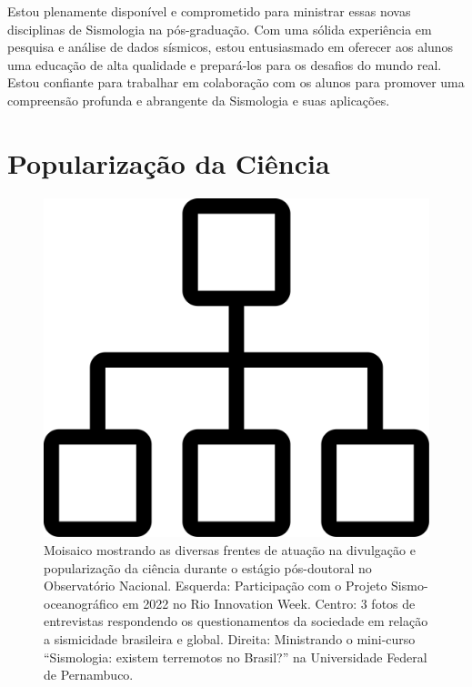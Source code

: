 \documentclass[10pt,a4paper,oneside]{book}
\newcommand{\HeroFigPad}{\vspace{-1cm}}
\begin{document}
Estou plenamente disponível e comprometido para ministrar essas novas disciplinas de Sismologia na pós-graduação. Com uma sólida experiência em pesquisa e análise de dados sísmicos, estou entusiasmado em oferecer aos alunos uma educação de alta qualidade e prepará-los para os desafios do mundo real. Estou confiante para trabalhar em colaboração com os alunos para promover uma compreensão profunda e abrangente da Sismologia e suas aplicações.



\chapter{Popularização da Ciência}
\label{cap_comunidade}

\bigskip

\begin{figure}[h]
  \HeroFigPad
  \begin{center}
    \includegraphics[width=\textwidth]{images/inicio.png}
  \end{center}
  \caption{
    Moisaico mostrando as diversas frentes de atuação na divulgação e popularização da ciência durante o estágio pós-doutoral no Observatório Nacional. Esquerda: Participação com o Projeto Sismo-oceanográfico em 2022 no Rio Innovation Week. Centro: 3 fotos de entrevistas respondendo os questionamentos da sociedade em relação a sismicidade brasileira e global. Direita: Ministrando o mini-curso “Sismologia: existem terremotos no Brasil?” na Universidade Federal de Pernambuco.}
\end{figure}
\end{document}
